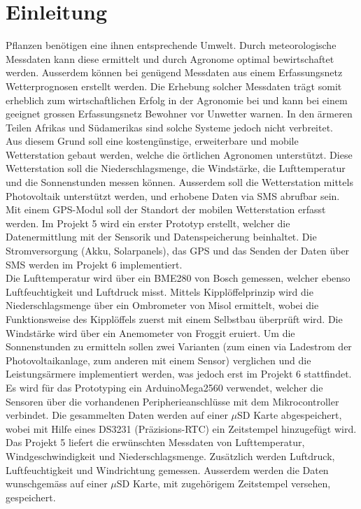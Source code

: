 \section{Einleitung}
Pflanzen benötigen eine ihnen entsprechende Umwelt. Durch meteorologische Messdaten kann diese ermittelt und durch Agronome optimal bewirtschaftet werden. Ausserdem können bei genügend Messdaten aus einem Erfassungsnetz Wetterprognosen erstellt werden. Die Erhebung solcher Messdaten trägt somit erheblich zum wirtschaftlichen Erfolg in der Agronomie bei und kann bei einem geeignet grossen Erfassungsnetz Bewohner vor Unwetter warnen. In den ärmeren Teilen Afrikas und Südamerikas sind solche Systeme jedoch nicht verbreitet.\\[0.5cm]
Aus diesem Grund soll eine kostengünstige, erweiterbare und mobile Wetterstation gebaut werden, welche die örtlichen Agronomen unterstützt. Diese Wetterstation soll die Niederschlagsmenge, die Windstärke, die Lufttemperatur und die Sonnenstunden messen können. Ausserdem soll die Wetterstation mittels Photovoltaik unterstützt werden, und erhobene Daten via SMS abrufbar sein. Mit einem GPS-Modul soll der Standort der mobilen Wetterstation erfasst werden. Im Projekt 5 wird ein erster Prototyp erstellt, welcher die Datenermittlung mit der Sensorik und Datenspeicherung beinhaltet. Die Stromversorgung (Akku, Solarpanels), das GPS und das Senden der Daten über SMS werden im Projekt 6 implementiert.\\[0.5cm]
Die Lufttemperatur wird über ein BME280 von Bosch gemessen, welcher ebenso Luftfeuchtigkeit und Luftdruck misst. Mittels Kipplöffelprinzip wird die Niederschlagsmenge über ein Ombrometer von Misol ermittelt, wobei die Funktionsweise des Kipplöffels zuerst mit einem Selbstbau überprüft wird. Die Windstärke wird über ein Anemometer von Froggit eruiert. Um die Sonnenstunden zu ermitteln sollen zwei Varianten (zum einen via Ladestrom der Photovoltaikanlage, zum anderen mit einem Sensor) verglichen und die Leistungsärmere implementiert werden, was jedoch erst im Projekt 6 stattfindet. Es wird für das Prototyping ein ArduinoMega2560 verwendet, welcher die Sensoren über die vorhandenen Peripherieanschlüsse mit dem Mikrocontroller verbindet. Die gesammelten Daten werden auf einer $\mu$SD Karte abgespeichert, wobei mit Hilfe eines DS3231 (Präzisions-RTC) ein Zeitstempel hinzugefügt wird.\\[0.5cm]
Das Projekt 5 liefert die erwünschten Messdaten von Lufttemperatur, Windgeschwindigkeit und Niederschlagsmenge. Zusätzlich werden Luftdruck, Luftfeuchtigkeit und Windrichtung gemessen. Ausserdem werden die Daten wunschgemäss auf einer $\mu$SD Karte, mit zugehörigem Zeitstempel versehen, gespeichert.\\[0.5cm]
